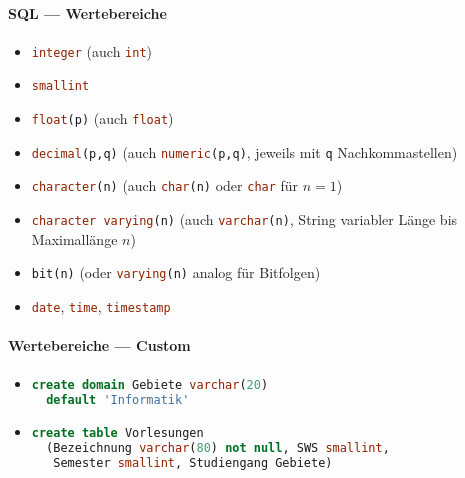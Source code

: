 \paragraph{SQL --- Wertebereiche}
\begin{itemize}
	\item \lstinline[language=sql]{integer} (auch \lstinline[language=sql]{int})
	\item \lstinline[language=sql]{smallint}
	\item \lstinline[language=sql]{float(p)} (auch \lstinline[language=sql]{float})
	\item \lstinline[language=sql]{decimal(p,q)} (auch \lstinline[language=sql]{numeric(p,q)}, jeweils mit \lstinline[language=sql]{q} Nachkommastellen)
	\item \lstinline[language=sql]{character(n)} (auch \lstinline[language=sql]{char(n)} oder \lstinline[language=sql]{char} für \( n=1 \))
	\item \lstinline[language=sql]{character varying(n)} (auch \lstinline[language=sql]{varchar(n)}, String variabler Länge bis Maximallänge \( n \))
	\item \lstinline[language=sql]{bit(n)} (oder \lstinline[language=sql]{varying(n)} analog für Bitfolgen)
	\item \lstinline[language=sql]{date}, \lstinline[language=sql]{time}, \lstinline[language=sql]{timestamp}
\end{itemize}

\paragraph{Wertebereiche --- Custom}
\begin{itemize}
	\item \begin{lstlisting}[language=sql]
create domain Gebiete varchar(20)
  default 'Informatik'
\end{lstlisting}
	\item \begin{lstlisting}[language=sql]
create table Vorlesungen
  (Bezeichnung varchar(80) not null, SWS smallint,
   Semester smallint, Studiengang Gebiete)
\end{lstlisting}
\end{itemize}

